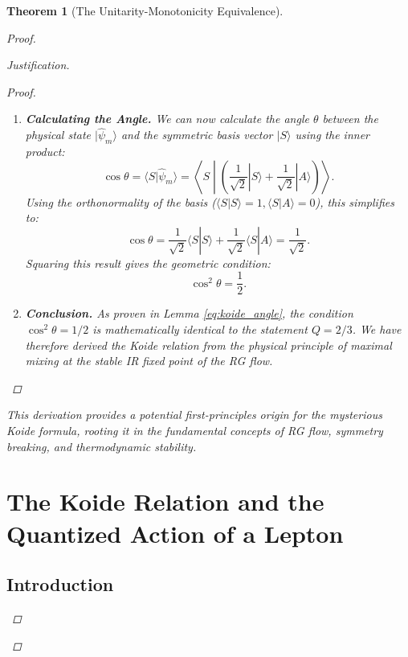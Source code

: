 \documentclass[11pt, letterpaper]{report}
\theoremstyle{plain} %
\newtheorem{theorem}{Theorem}[chapter]
\theoremstyle{definition} %
\theoremstyle{remark} %
\begin{document}
\begin{theorem}[The Unitarity-Monotonicity Equivalence]
\begin{proof}
\begin{proof}[Justification]
\begin{proof}
\begin{enumerate}
    \item \textbf{Calculating the Angle.} We can now calculate the angle $\theta$ between the physical state $|\hat{\psi}_m\rangle$ and the symmetric basis vector $|S\rangle$ using the inner product:
    \begin{equation}
        \cos\theta = \langle S | \hat{\psi}_m \rangle = \left\langle S \middle| \left( \frac{1}{\sqrt{2}}|S\rangle + \frac{1}{\sqrt{2}}|A\rangle \right) \right\rangle.
    \end{equation}
    Using the orthonormality of the basis ($\langle S|S\rangle=1, \langle S|A\rangle=0$), this simplifies to:
    \begin{equation}
        \cos\theta = \frac{1}{\sqrt{2}}\langle S|S\rangle + \frac{1}{\sqrt{2}}\langle S|A\rangle = \frac{1}{\sqrt{2}}.
    \end{equation}
    Squaring this result gives the geometric condition:
    \begin{equation}
        \cos^2\theta = \frac{1}{2}.
    \end{equation}




    \item \textbf{Conclusion.} As proven in Lemma \ref{eq:koide_angle}, the condition $\cos^2\theta=1/2$ is mathematically identical to the statement $Q=2/3$. We have therefore derived the Koide relation from the physical principle of maximal mixing at the stable IR fixed point of the RG flow.
\end{enumerate}
\end{proof}

This derivation provides a potential first-principles origin for the mysterious Koide formula, rooting it in the fundamental concepts of RG flow, symmetry breaking, and thermodynamic stability.

\section{The Koide Relation and the Quantized Action of a Lepton}
\label{sec:koide_action_synthesis}

\subsection{Introduction}


\end{proof}
\end{proof}
\end{theorem}
\end{document}
